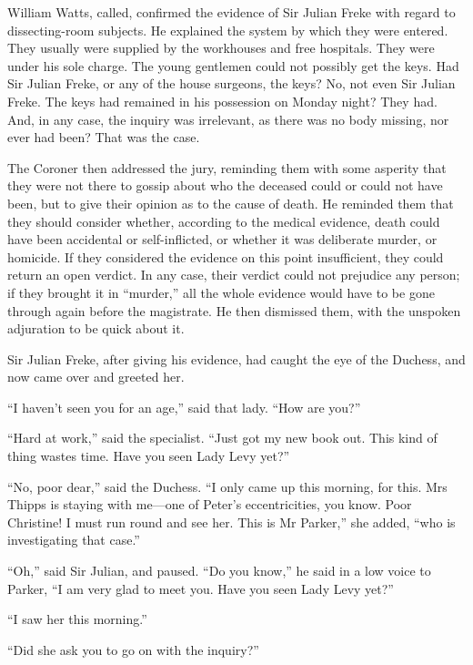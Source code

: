 William Watts, called, confirmed the evidence of Sir Julian Freke with regard to dissecting-room subjects. He explained the system by which they were entered. They usually were supplied by the workhouses and free hospitals. They were under his sole charge. The young gentlemen could not possibly get the keys. Had Sir Julian Freke, or any of the house surgeons, the keys? No, not even Sir Julian Freke. The keys had remained in his possession on Monday night? They had. And, in any case, the inquiry was irrelevant, as there was no body missing, nor ever had been? That was the case.

The Coroner then addressed the jury, reminding them with some asperity that they were not there to gossip about who the deceased could or could not have been, but to give their opinion as to the cause of death. He reminded them that they should consider whether, according to the medical evidence, death could have been accidental or self-inflicted, or whether it was deliberate murder, or homicide. If they considered the evidence on this point insufficient, they could return an open verdict. In any case, their verdict could not prejudice any person; if they brought it in \enquote{murder,} all the whole evidence would have to be gone through again before the magistrate. He then dismissed them, with the unspoken adjuration to be quick about it.

Sir Julian Freke, after giving his evidence, had caught the eye of the Duchess, and now came over and greeted her.

\enquote{I haven’t seen you for an age,} said that lady. \enquote{How are you?}

\enquote{Hard at work,} said the specialist. \enquote{Just got my new book out. This kind of thing wastes time. Have you seen Lady Levy yet?}

\enquote{No, poor dear,} said the Duchess. \enquote{I only came up this morning, for this. Mrs Thipps is staying with me\allowbreak---\allowbreak one of Peter’s eccentricities, you know. Poor Christine! I must run round and see her. This is Mr Parker,} she added, \enquote{who is investigating that case.}

\enquote{Oh,} said Sir Julian, and paused. \enquote{Do you know,} he said in a low voice to Parker, \enquote{I am very glad to meet you. Have you seen Lady Levy yet?}

\enquote{I saw her this morning.}

\enquote{Did she ask you to go on with the inquiry?}

